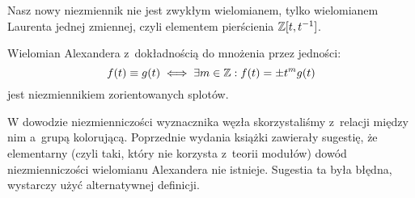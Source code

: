 Nasz nowy niezmiennik nie jest zwykłym wielomianem, tylko wielomianem Laurenta jednej zmiennej, czyli elementem pierścienia $\mathbb Z[t, t^{-1}]$.

\begin{proposition}
    \label{alexander_invariance}
    Wielomian Alexandera z~dokładnością do mnożenia przez jedności:
    \begin{equation}
        f(t) \equiv g(t) \iff \exists m \in \mathbb Z: f(t) = \pm t^m g(t)
    \end{equation}
    jest niezmiennikiem zorientowanych splotów.
\end{proposition}

W dowodzie niezmienniczości wyznacznika węzła skorzystaliśmy z~relacji między nim a~grupą kolorującą.
Poprzednie wydania książki zawierały sugestię, że elementarny (czyli taki, który nie korzysta z~teorii modułów) dowód niezmienniczości wielomianu Alexandera nie istnieje.
Sugestia ta była błędna, wystarczy użyć alternatywnej definicji.

